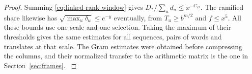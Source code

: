 \begin{proof}
Summing
\eqref{eq:linked-rank-window} gives
\(D_*/\sum_u d_u\le x^{-C_H}\).
The ramified share likewise has
\(\sqrt{\max_u\delta_u}\le e^{-y}\) eventually, from
\(T_u\ge b^{m/2}\) and \(f\le x^5\). All these bounds use one
scale and one selection. Taking the maximum of their thresholds
gives the same estimates for all sequences, pairs of words and
translates at that scale. The Gram estimates were obtained before
compressing the columns, and their normalized transfer to the
arithmetic matrix is the one in Section~\ref{sec:frames}.
\label{cor:selected-row-gram-9}
\end{proof}
